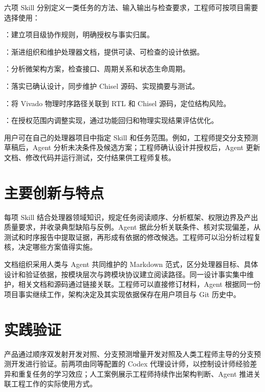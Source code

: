 \documentclass[UTF8,fontset=none,zihao=-4,a4paper]{ctexart}
\newenvironment{SkillList}{%
  \begin{list}{\textbullet}{%
    \setlength{\leftmargin}{1.3em}%
    \setlength{\labelwidth}{0.6em}%
    \setlength{\labelsep}{0.7em}%
    \setlength{\topsep}{5pt}%
    \setlength{\itemsep}{3pt}%
    \setlength{\parsep}{0pt}%
    \setlength{\partopsep}{0pt}%
  }\raggedright
}{\end{list}}
\begin{document}
六项 Skill 分别定义一类任务的方法、输入输出与检查要求，工程师可按项目需要选择使用：

\begin{SkillList}
\item {}：建立项目级协作规则，明确授权与事实归属。
\item {}：渐进组织和维护处理器文档，提供可读、可检查的设计依据。
\item {}：分析微架构方案，检查接口、周期关系和状态生命周期。
\item {}：落实已确认设计，同步维护 Chisel 源码、实现摘要与测试。
\item {}：将 Vivado 物理时序路径关联到 RTL 和 Chisel 源码，定位结构风险。
\item {}：在授权范围内调整实现，通过功能回归和物理实现结果评估优化。
\end{SkillList}

用户可在自己的处理器项目中指定 Skill 和任务范围。例如，工程师提交分支预测草稿后，Agent 分析未决条件及候选方案；工程师确认设计并授权后，Agent 更新文档、修改代码并运行测试，交付结果供工程师复核。

\clearpage
\section{主要创新与特点}

每项 Skill 结合处理器领域知识，规定任务阅读顺序、分析框架、权限边界及产出质量要求，并收录典型缺陷与反例。Agent 据此分析关联条件、核对实现偏差，从测试和时序报告中提取证据，再形成有依据的修改候选。工程师可以沿分析过程复核，决定哪些方案值得实施。

文档组织采用人类与 Agent 共同维护的 Markdown 范式，区分处理器目标、具体设计和验证依据，按模块层次与跨模块协议建立阅读路径。同一设计事实集中维护，相关文档和源码通过链接关联。工程师可以直接修订材料，Agent 根据同一份项目事实继续工作，架构决定及其实现依据保存在用户项目与 Git 历史中。

\section{实践验证}

产品通过顺序双发射开发对照、分支预测增量开发对照及人类工程师主导的分支预测开发进行验证。前两项由同等配置的 Codex 代理设计师，以控制设计师经验差异和重复任务的学习效应；人工案例展示工程师持续作出架构判断、Agent 推进关联工程工作的实际使用方式。
\end{document}

